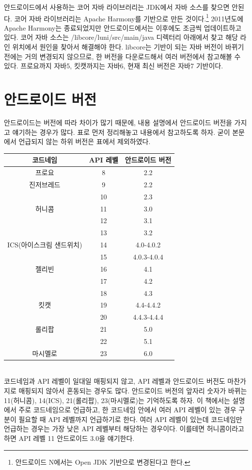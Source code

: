안드로이드에서 사용하는 코어 자바 라이브러리는 JDK에서 자바 소스를 찾으면 안된다. 
코어 자바 라이브러리는 Apache Harmony를 기반으로 만든 것이다.\footnote{안드로이드 N에서는 Open JDK 기반으로 변경된다고 한다.} 2011년도에 Apache Harmony는 종료되었지만 안드로이드에서는 이후에도 조금씩 업데이트하고 있다. 
코어 자바 소스는 /libcore/luni/src/main/java 디렉터리 아래에서 찾고 해당 라인 위치에서 원인을 찾아서 해결해야 한다.  
libcore는 기반이 되는 자바 버전이 바뀌기 전에는 거의 변경되지 않으므로, 한 버전을 다운로드해서 여러 버전에서 참고해볼 수 있다. 프로요까지 자바5, 킷캣까지는 자바6, 현재 최신 버전은 자바7 기반이다.

\section{안드로이드 버전}
안드로이드는 버전에 따라 차이가 많기 때문에, 내용 설명에서 안드로이드 버전을 가지고 얘기하는 경우가 많다. 
표로 먼저 정리해놓고 내용에서 참고하도록 하자. 굳이 본문에서 언급되지 않는 하위 버전은 표에서 제외하였다.\\

\begin{tabular}{|c|c|c|}\hline
코드네임 & API 레벨 & 안드로이드 버전 \\ \hline
프로요 & 8 & 2.2 \\ \hline
진저브레드 & 9 & 2.2\\ \cline{2-3}
 & 10 & 2.3\\ \hline
허니콤 & 11 & 3.0\\ \cline{2-3}
 & 12 & 3.1\\ \cline{2-3}
 & 13 & 3.2\\ \hline
ICS(아이스크림 샌드위치) & 14 & 4.0-4.0.2\\ \cline{2-3}
 & 15 & 4.0.3-4.0.4\\ \hline 
젤리빈 & 16 & 4.1\\ \cline{2-3}
 & 17 & 4.2\\ \cline{2-3}
 & 18 & 4.3\\ \hline
킷캣 & 19 & 4.4-4.4.2\\ \cline{2-3}
 & 20 & 4.4.3-4.4.4\\ \hline  
롤리팝 & 21 & 5.0\\ \cline{2-3}
 & 22 & 5.1\\ \hline 
마시멜로 & 23 & 6.0\\ \hline 
\end{tabular}\\

코드네임과 API 레벨이 일대일 매핑되지 않고, API 레벨과 안드로이드 버전도 마찬가지로 매핑되지 않아서 혼동되는 경우도 많다. 안드로이드 버전의 앞자리 숫자가 바뀌는 11(허니콤), 14(ICS), 21(롤리팝), 23(마시멜로)는 기억하도록 하자.
이 책에서는 설명에서 주로 코드네임으로 언급하고, 한 코드네임 안에서 여러 API 레벨이 있는 경우 구분이 필요할 때 API 레벨까지 언급하기로 한다. 
여러 API 레벨이 있는데 코드네임만 언급하는 경우는 가장 낮은 API 레벨부터 해당하는 경우이다. 이를테면 허니콤이라고 하면 API 레벨 11 안드로이드 3.0을 얘기한다.\\

